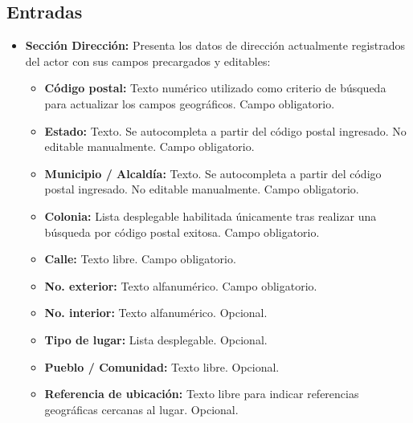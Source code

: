 \subsection{Entradas}
\begin{itemize}
	\item \textbf{Sección Dirección:} Presenta los datos de dirección 
	actualmente registrados del actor con sus campos precargados y editables:
	\begin{itemize}
		\item \textbf{Código postal:} Texto numérico utilizado como criterio de 
		búsqueda para actualizar los campos geográficos. Campo obligatorio.
		\item \textbf{Estado:} Texto. Se autocompleta a partir del código postal 
		ingresado. No editable manualmente. Campo obligatorio.
		\item \textbf{Municipio / Alcaldía:} Texto. Se autocompleta a partir del 
		código postal ingresado. No editable manualmente. Campo obligatorio.
		\item \textbf{Colonia:} Lista desplegable habilitada únicamente tras 
		realizar una búsqueda por código postal exitosa. Campo obligatorio.
		\item \textbf{Calle:} Texto libre. Campo obligatorio.
		\item \textbf{No. exterior:} Texto alfanumérico. Campo obligatorio.
		\item \textbf{No. interior:} Texto alfanumérico. Opcional.
		\item \textbf{Tipo de lugar:} Lista desplegable. Opcional.
		\item \textbf{Pueblo / Comunidad:} Texto libre. Opcional.
		\item \textbf{Referencia de ubicación:} Texto libre para indicar 
		referencias geográficas cercanas al lugar. Opcional.
	\end{itemize}
\end{itemize}

